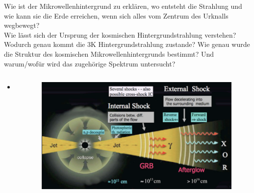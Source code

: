   \begin{frame}{Wie ist der Mikrowellenhintergrund zu erklären, wo entsteht die Strahlung
  und wie kann sie die Erde erreichen, wenn sich alles vom Zentrum des Urknalls
  wegbewegt?\\
    Wie lässt sich der Ursprung der kosmischen Hintergrundstrahlung verstehen?\\
    Wodurch genau kommt die 3K Hintergrundstrahlung zustande? Wie genau wurde die Struktur des kosmischen Mikrowellenhintergrunds bestimmt?
    Und warum/wofür wird das zugehörige Spektrum untersucht?}
    \begin{columns}
   \begin{column}{0.5\textwidth}
    \begin{itemize}
      \setlength\itemsep{2em}
      \item .
     \end{itemize}
  \vspace{2em}
  \end{column}
  \begin{column}{0.5\textwidth}
  \begin{figure}
    \centering
    \includegraphics[width=\textwidth]{images/fireball.png}
  \end{figure}
  \end{column}
    \end{columns}
  \end{frame}


